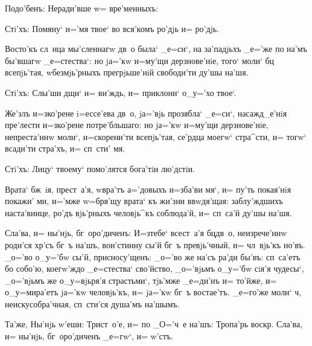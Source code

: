 Подо'бенъ: Неради'вше w= вре'менныхъ:

Стi'хъ: Помяну` и='мя твое` во вся'комъ ро'дjь и= 
ро'дjь.

Восто'къ сл~нца мы'сленнагw дв~о была` _е=си`, на 
за'падjьхъ _е='же по на'мъ бы'вшагw _е=стества`: но 
jа='кw и=му'щи дерзнове'нiе, того` моли` бц 
всепjь'тая, w\т безмjь'рныхъ прегрjьше'нiй свободи'ти 
ду'шы на'шя.

Стi'хъ: Слы'ши дщи` и= ви'ждь, и= приклони` о_у='хо 
твое`.

Же'злъ и=з\ъ ко'рене i=ессе'ева дв~о, jа='вjь 
прозябла` _е=си`, насажд_е'нiя пре'лести и=з\ъ ко'рене 
потре'бльшаго: но jа='кw и=му'щи дерзнове'нiе, 
непреста'ннw моли`, и=скорени'ти всепjь'тая, се'рдца 
моегw` стра^сти, и= тогw` всади'ти стра'хъ, и= сп~сти' 
мя.

Стi'хъ: Лицу` твоему` помо'лятся бога'тiи лю'дстiи.

Врата` бж~iя, прест~а'я, w\т вра'тъ а='довыхъ и=зба'ви 
мя`, и= пу'ть покая'нiя покажи' ми, и='мже w=бря'щу 
врата` къ жи'зни ввwдя'щая: заблу'ждшихъ наста'внице, 
ро'дъ вjь'рныхъ человjь^къ соблюда'й, и= сп~са'й ду'шы 
на'шя.

Сла'ва, и= ны'нjь, бг~оро'диченъ: И=з\ъ тебе` 
всест~а'я бц дв~о, неизрече'ннw роди'ся хр'съ бг~ъ 
на'шъ, вои'стинну сы'й бг~ъ превjь'чный, и= чл~вjь'къ 
но'въ. _о='во о_у='бw сы'й, присносу'щенъ: _о='во же 
на'съ ра'ди бы'въ: сп~са'етъ бо собо'ю, коегw'ждо 
_е=стества` сво'йство, _о='вjьмъ о_у='бw сiя'я чудесы`, 
_о='вjьмъ же о_у=вjьря'я страстьми`, тjь'мже _е=ди'нъ и= 
то'йже, и= о_у=мира'етъ jа='кw человjь'къ, и= jа='кw бг~ъ 
востае'тъ. _е=го'же моли` ч, неискусобра'чная, 
сп~сти'ся душа'мъ на'шымъ.

Та'же, Ны'нjь w'еши: Трист~о'е, и= по _О='ч~е 
на'шъ: Тропа'рь воскр. Сла'ва, и= ны'нjь, 
бг~оро'диченъ _е=гw`, и= w'стъ.
